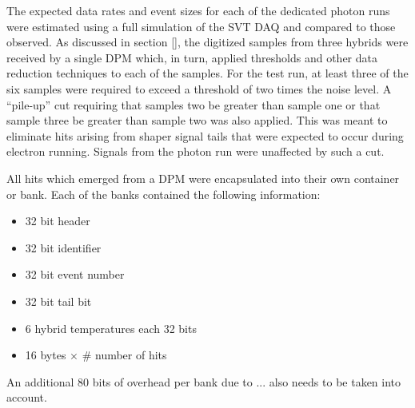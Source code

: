 
%
%

The expected data rates and event sizes for each of the dedicated photon runs
were estimated using a full simulation of the SVT DAQ and compared to those
observed.  As discussed in 
section [], the digitized samples from three hybrids were received by a single
DPM which, in turn, applied thresholds and other data reduction techniques to 
each of the samples.  For the test run, at least three of the six samples
were required to exceed a threshold of two times the noise level.  A 
``pile-up'' cut requiring that samples two be greater than sample one or that
sample three be greater than sample two was also applied.  This was meant
to eliminate hits arising from shaper signal tails that were expected to occur 
during electron running.  Signals from the photon run were unaffected by such
a cut. 

All hits which emerged from a DPM were encapsulated into their own container 
or bank. Each of the banks contained the following information:
\begin{itemize}
    \item 32 bit header
    \item 32 bit identifier
    \item 32 bit event number
    \item 32 bit tail bit
    \item 6 hybrid temperatures each 32 bits
    \item 16 bytes $\times$ \# number of hits 
\end{itemize} 
An additional 80 bits of overhead per bank due to ... also needs to be taken 
into account.

